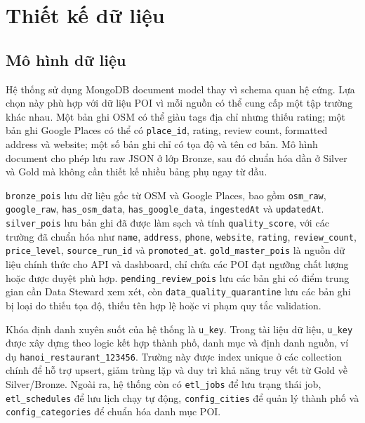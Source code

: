 \documentclass[12pt,a4paper]{article}
\begin{document}
\section{Thiết kế dữ liệu}

\subsection{Mô hình dữ liệu}

Hệ thống sử dụng MongoDB document model thay vì schema quan hệ cứng. Lựa chọn này phù hợp với dữ liệu POI vì mỗi nguồn có thể cung cấp một tập trường khác nhau. Một bản ghi OSM có thể giàu tags địa chỉ nhưng thiếu rating; một bản ghi Google Places có thể có \texttt{place\_id}, rating, review count, formatted address và website; một số bản ghi chỉ có tọa độ và tên cơ bản. Mô hình document cho phép lưu raw JSON ở lớp Bronze, sau đó chuẩn hóa dần ở Silver và Gold mà không cần thiết kế nhiều bảng phụ ngay từ đầu.

\texttt{bronze\_pois} lưu dữ liệu gốc từ OSM và Google Places, bao gồm \texttt{osm\_raw}, \texttt{google\_raw}, \texttt{has\_osm\_data}, \texttt{has\_google\_data}, \texttt{ingestedAt} và \texttt{updatedAt}. \texttt{silver\_pois} lưu bản ghi đã được làm sạch và tính \texttt{quality\_score}, với các trường đã chuẩn hóa như \texttt{name}, \texttt{address}, \texttt{phone}, \texttt{website}, \texttt{rating}, \texttt{review\_count}, \texttt{price\_level}, \texttt{source\_run\_id} và \texttt{promoted\_at}. \texttt{gold\_master\_pois} là nguồn dữ liệu chính thức cho API và dashboard, chỉ chứa các POI đạt ngưỡng chất lượng hoặc được duyệt phù hợp. \texttt{pending\_review\_pois} lưu các bản ghi có điểm trung gian cần Data Steward xem xét, còn \texttt{data\_quality\_quarantine} lưu các bản ghi bị loại do thiếu tọa độ, thiếu tên hợp lệ hoặc vi phạm quy tắc validation.

Khóa định danh xuyên suốt của hệ thống là \texttt{u\_key}. Trong tài liệu dữ liệu, \texttt{u\_key} được xây dựng theo logic kết hợp thành phố, danh mục và định danh nguồn, ví dụ \texttt{hanoi\_restaurant\_123456}. Trường này được index unique ở các collection chính để hỗ trợ upsert, giảm trùng lặp và duy trì khả năng truy vết từ Gold về Silver/Bronze. Ngoài ra, hệ thống còn có \texttt{etl\_jobs} để lưu trạng thái job, \texttt{etl\_schedules} để lưu lịch chạy tự động, \texttt{config\_cities} để quản lý thành phố và \texttt{config\_categories} để chuẩn hóa danh mục POI.
\end{document}
